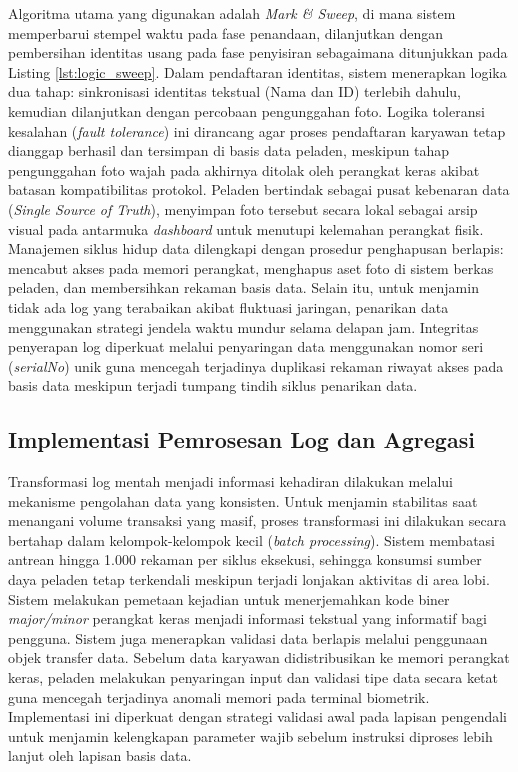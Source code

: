 Algoritma utama yang digunakan adalah \textit{Mark \& Sweep}, di mana sistem memperbarui stempel waktu pada fase penandaan, dilanjutkan dengan pembersihan identitas usang pada fase penyisiran sebagaimana ditunjukkan pada Listing \ref{lst:logic_sweep}. 
Dalam pendaftaran identitas, sistem menerapkan logika dua tahap: sinkronisasi identitas tekstual (Nama dan ID) terlebih dahulu, kemudian dilanjutkan dengan percobaan pengunggahan foto. Logika toleransi kesalahan (\textit{fault tolerance}) ini dirancang agar proses pendaftaran karyawan tetap dianggap berhasil dan tersimpan di basis data peladen, meskipun tahap pengunggahan foto wajah pada akhirnya ditolak oleh perangkat keras akibat batasan kompatibilitas protokol. Peladen bertindak sebagai pusat kebenaran data (\textit{Single Source of Truth}), menyimpan foto tersebut secara lokal sebagai arsip visual pada antarmuka \textit{dashboard} untuk menutupi kelemahan perangkat fisik.
Manajemen siklus hidup data dilengkapi dengan prosedur penghapusan berlapis: mencabut akses pada memori perangkat, menghapus aset foto di sistem berkas peladen, dan membersihkan rekaman basis data. Selain itu, untuk menjamin tidak ada log yang terabaikan akibat fluktuasi jaringan, penarikan data menggunakan strategi jendela waktu mundur selama delapan jam. Integritas penyerapan log diperkuat melalui penyaringan data menggunakan nomor seri (\textit{serialNo}) unik guna mencegah terjadinya duplikasi rekaman riwayat akses pada basis data meskipun terjadi tumpang tindih siklus penarikan data.



\subsection{Implementasi Pemrosesan Log dan Agregasi}
Transformasi log mentah menjadi informasi kehadiran dilakukan melalui mekanisme pengolahan data yang konsisten. Untuk menjamin stabilitas saat menangani volume transaksi yang masif, proses transformasi ini dilakukan secara bertahap dalam kelompok-kelompok kecil (\textit{batch processing}). Sistem membatasi antrean hingga 1.000 rekaman per siklus eksekusi, sehingga konsumsi sumber daya peladen tetap terkendali meskipun terjadi lonjakan aktivitas di area lobi. Sistem melakukan pemetaan kejadian untuk menerjemahkan kode biner \textit{major/minor} perangkat keras menjadi informasi tekstual yang informatif bagi pengguna. Sistem juga menerapkan validasi data berlapis melalui penggunaan objek transfer data. Sebelum data karyawan didistribusikan ke memori perangkat keras, peladen melakukan penyaringan input dan validasi tipe data secara ketat guna mencegah terjadinya anomali memori pada terminal biometrik. Implementasi ini diperkuat dengan strategi validasi awal pada lapisan pengendali untuk menjamin kelengkapan parameter wajib sebelum instruksi diproses lebih lanjut oleh lapisan basis data.

